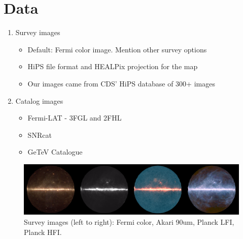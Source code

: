 \section{Data}


\begin{enumerate}
\item Survey images

  \begin{itemize}

  \item Default: Fermi color image. Mention other survey options

  \item HiPS file format and HEALPix projection for the map

  \item Our images came from CDS' HiPS database of 300+ images

  \end{itemize}


\item Catalog images

  \begin{itemize}

  \item Fermi-LAT - 3FGL and 2FHL

  \item SNRcat

  \item GeTeV Catalogue

  \end{itemize}
\end{enumerate}


\begin{figure}[h]
  \centerline{\includegraphics[width=\textwidth]{figures/four_images}}
  \caption{Survey images (left to right): Fermi color, Akari 90um, Planck LFI, Planck HFI.}
\end{figure}




